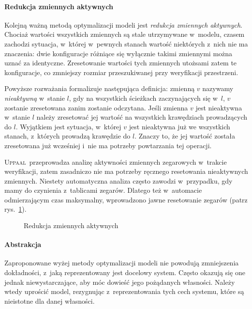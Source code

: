 \documentclass{pracamgr}
\newcommand{\imgr}[1]{rys.~\ref{#1}}
\newcommand{\upp}{\textsc{Uppaal}}
\theoremstyle{plain}
\begin{document}
\paragraph{Redukcja zmiennych aktywnych} Kolejną ważną metodą
optymalizacji modeli jest \emph{redukcja zmiennych aktywnych}.
Chociaż wartości wszystkich zmiennych są stale utrzymywane w~modelu,
czasem zachodzi sytuacja, w~której w~pewnych stanach wartość
niektórych z~nich nie ma znaczenia: dwie konfiguracje różniące się wyłącznie
takimi zmiennymi można uznać za identyczne. Zresetowanie wartości tych
zmiennych utożsami zatem te konfiguracje, co zmniejszy rozmiar przeszukiwanej
przy weryfikacji przestrzeni.

Powyższe rozważania formalizuje następująca definicja: zmienną $v$
nazywamy \emph{nieaktywną} w~stanie $l$, gdy na wszystkich
ścieżkach zaczynających się w~$l$, $v$ zostanie zresetowana zanim
zostanie odczytana. Jeśli zmienna $v$ jest nieaktywna w~stanie
$l$ należy zresetować jej wartość na wszystkich krawędziach
prowadzących do $l$. Wyjątkiem jest sytuacja, w~której $v$ jest
nieaktywna już we wszystkich stanach, z~których prowadzą
krawędzie do $l$. Znaczy to, że jej wartość została zresetowana już wcześniej
i~nie ma potrzeby powtarzania tej operacji.

\upp\ przeprowadza analizę aktywności zmiennych zegarowych w~trakcie
weryfikacji, zatem zasadniczo nie ma potrzeby ręcznego resetowania
nieaktywnych zmiennych. Niestety automatyczna analiza często zawodzi
w~przypadku, gdy mamy do czynienia z~tablicami zegarów. Dlatego też
w~automacie odmierzającym czas maksymalny, wprowadzono jawne resetowanie
zegarów (patrz \imgr{img:models-active-reduction}).

\begin{figure}
  \centering
  \hfill
  \caption{Redukcja zmiennych aktywnych}
  \label{img:models-active-reduction}
\end{figure}

\paragraph{Abstrakcja} Zaproponowane wyżej metody optymalizacji modeli
nie powodują zmniejszenia dokładności, z~jaką reprezentowany jest
docelowy system. Często okazują się one jednak niewystarczające, aby
móc dowieść jego pożądanych własności. Należy wtedy uprościć model,
rezygnując z~reprezentowania tych cech systemu, które są nieistotne
dla danej własności.
\end{document}
